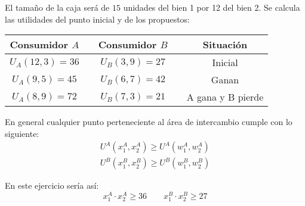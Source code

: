 El tamaño de la caja será de $15$ unidades del bien 1 por 12 del bien 2. Se calcula las utilidades del punto inicial y de los propuestos:

	\begin{center}
		\begingroup
			\setlength{\tabcolsep}{10pt} %
			\renewcommand{\arraystretch}{1.5} %
				\begin{tabular}{ccccc}
						\hline
					Consumidor $A$ & {} & Consumidor $B$ & {} & Situación \\
						\hline
					$U_A(12,3) = 36$ & {} & $U_B(3,9) = 27$ & {} & Inicial\\
					$U_A(9,5)  = 45$ & {} & $U_B(6,7) = 42$ & {} & Ganan\\
					$U_A(8,9)  = 72$ & {} & $U_B(7,3) = 21$ & {} & A gana y B pierde\\
						\hline
				\end{tabular}
		\endgroup
	\end{center}

En general cualquier punto perteneciente al área de intercambio cumple con lo siguiente:
	\begin{gather*}
		U^{A}\left(x_{1}^{A}, x_{2}^{A}\right) \geq U^{A}\left(w_{1}^{A}, w_{2}^{A}\right) \\
		U^{B}\left(x_{1}^{B}, x_{2}^{B}\right) \geq U^{B}\left(w_{1}^{B}, w_{2}^{B}\right)
	\end{gather*}

En este ejercicio sería así:
	$$x_{1}^{A} \cdot x_{2}^{A} \geq 36 \qquad x_{1}^{B} \cdot x_{2}^{B} \geq 27$$

